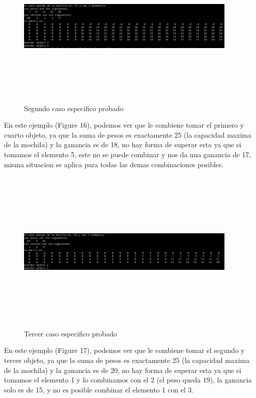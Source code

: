 \documentclass[spanish]{article}
\begin{document}
	\begin{figure}[H]
		\centering
		\includegraphics[width=400px,height=300px]{casoEspecifico2}
		\caption{Segundo caso especifico probado}
	\end{figure}
	En este ejemplo (Figure 16), podemos ver que le combiene tomar el primero y cuarto objeto, ya que la suma de pesos es exactamente 25 (la capacidad maxima de la mochila) y la ganancia es de 18, no hay forma de superar esta ya que si tomamos el elemento 5, este no se puede combinar y nos da una ganancia de 17, misma situacion se aplica para todas las demas combinaciones posibles.
	\begin{figure}[H]
		\centering
		\includegraphics[width=400px,height=300px]{casoEspecifico3}
		\caption{Tercer caso especifico probado}
	\end{figure}
	En este ejemplo (Figure 17), podemos ver que le combiene tomar el segundo y tercer objeto, ya que la suma de pesos es exactamente 25 (la capacidad maxima de la mochila) y la ganancia es de 20, no hay forma de superar esta ya que si tomamos el elemento 1 y lo combinamos con el 2 (el peso queda 19), la ganancia solo es de 15, y no es posible combinar el elemento 1 con el 3.
\end{document}
